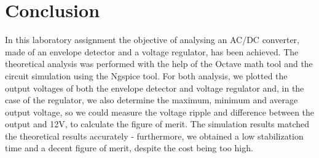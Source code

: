 \section{Conclusion}
\label{sec:conclusion}

In this laboratory assignment the objective of analysing an AC/DC converter, made of an envelope detector and a voltage regulator, has been achieved. The theoretical analysis was performed with the help of the Octave math tool and the circuit simulation using the Ngspice tool. For both analysis, we plotted the output voltages of both the envelope detector and voltage regulator and, in the case of the regulator, we also determine the maximum, minimum and average output voltage, so we could measure the voltage ripple and difference between the output and 12V, to calculate the figure of merit. The simulation results matched the theoretical results accurately - furthermore, we obtained a low stabilization time and a decent figure of merit, despite the cost being too high.
